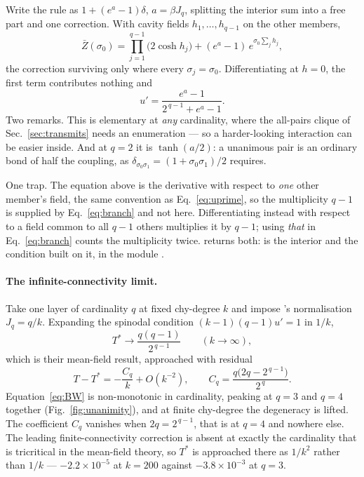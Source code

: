 Write the rule as $1+(e^{a}-1)\delta$, $a=\beta J_{q}$, splitting the interior
sum into a free part and one correction. With cavity fields
$h_{1},\dots,h_{q-1}$ on the other members,
\[
  \bar{Z}(\sigma_{0})=\prod_{j=1}^{q-1}\bigl(2\cosh h_{j}\bigr)
                +(e^{a}-1)\,e^{\sigma_{0}\sum_{j}h_{j}},
\]
the correction surviving only where every $\sigma_{j}=\sigma_{0}$.
Differentiating at $h=0$, the first term contributes nothing and
\[
  u'=\frac{e^{a}-1}{2^{\,q-1}+e^{a}-1}.
\]
Two remarks. This is elementary at \emph{any} cardinality, where the all-pairs
clique of Sec.~\ref{sec:transmits} needs an enumeration --- so a harder-looking
interaction can be easier inside. And at $q=2$ it is $\tanh(a/2)$: a unanimous
pair is an ordinary bond of half the coupling, as
$\delta_{\sigma_{0}\sigma_{1}}=(1+\sigma_{0}\sigma_{1})/2$ requires.

One trap. The equation above is the derivative with respect to \emph{one} other
member's field, the same convention as Eq.~\eqref{eq:uprime}, so the
multiplicity $q-1$ is supplied by Eq.~\eqref{eq:branch} and not here.
Differentiating instead with respect to a field common to all $q-1$ others
multiplies it by $q-1$; using \emph{that} in Eq.~\eqref{eq:branch} counts the
multiplicity twice.  returns both:  is the
interior and  the condition built on it, in the module
.

\paragraph{The infinite-connectivity limit.} Take one layer of cardinality $q$
at fixed chy-degree $k$ and impose \citeauthor{son2026}'s normalisation
$J_{q}=q/k$. Expanding the spinodal condition $(k-1)(q-1)u'=1$ in $1/k$,
\begin{equation}
  T^{*}\longrightarrow\frac{q(q-1)}{2^{\,q-1}}
  \qquad(k\to\infty),
  \label{eq:BW}
\end{equation}
which is their mean-field result, approached with residual
\begin{equation}
  T-T^{*}=-\frac{C_{q}}{k}+O(k^{-2}),
  \qquad
  C_{q}=\frac{q\bigl(2q-2^{\,q-1}\bigr)}{2^{\,q}}.
  \label{eq:Cq}
\end{equation}
Equation~\eqref{eq:BW} is non-monotonic in cardinality, peaking at $q=3$ and
$q=4$ together (Fig.~\ref{fig:unanimity}), and at finite chy-degree the
degeneracy is lifted. The coefficient $C_{q}$ vanishes when
$2q=2^{\,q-1}$, that is at $q=4$ and nowhere else. The leading
finite-connectivity correction is absent at exactly the cardinality that is
tricritical in the mean-field theory, so $T^{*}$ is approached there as $1/k^{2}$
rather than $1/k$ --- $-2.2\times10^{-5}$ at $k=200$ against
$-3.8\times10^{-3}$ at $q=3$.

